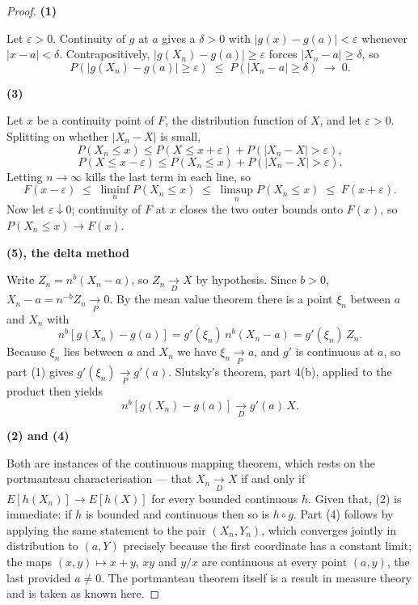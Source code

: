 \documentclass[12pt,a4paper]{report}
\theoremstyle{definition}
\newcommand{\subhead}[1]{%
  \par\medskip\noindent\textbf{#1}\par\nobreak\smallskip}
\begin{document}
\begin{proof}
\subhead{(1)}
Let $\varepsilon>0$. Continuity of $g$ at $a$ gives a $\delta>0$ with
$\left|g(x)-g(a)\right|<\varepsilon$ whenever $\left|x-a\right|<\delta$.
Contrapositively, $\left|g(X_n)-g(a)\right|\geq\varepsilon$ forces
$\left|X_n-a\right|\geq\delta$, so
\[P\left(\left|g(X_n)-g(a)\right|\geq\varepsilon\right)
\;\leq\; P\left(\left|X_n-a\right|\geq\delta\right)\;\longrightarrow\;0 .\]

\subhead{(3)}
Let $x$ be a continuity point of $F$, the distribution function of $X$, and let
$\varepsilon>0$. Splitting on whether $\left|X_n-X\right|$ is small,
\[P(X_n\leq x) \leq P(X\leq x+\varepsilon) + P\left(\left|X_n-X\right|>\varepsilon\right),\]
\[P(X\leq x-\varepsilon) \leq P(X_n\leq x) + P\left(\left|X_n-X\right|>\varepsilon\right).\]
Letting $n\rightarrow\infty$ kills the last term in each line, so
\[F(x-\varepsilon) \;\leq\; \liminf_n P(X_n\leq x) \;\leq\; \limsup_n P(X_n\leq x)
\;\leq\; F(x+\varepsilon).\]
Now let $\varepsilon\downarrow 0$; continuity of $F$ at $x$ closes the two outer
bounds onto $F(x)$, so $P(X_n\leq x)\rightarrow F(x)$.

\subhead{(5), the delta method}
Write $Z_n = n^{b}\left(X_n-a\right)$, so $Z_n \underset{D}{\longrightarrow} X$
by hypothesis. Since $b>0$, $X_n - a = n^{-b}Z_n \underset{P}{\longrightarrow} 0$.
By the mean value theorem there is a point $\xi_n$ between $a$ and $X_n$ with
\[n^{b}\left[g(X_n)-g(a)\right] = g'(\xi_n)\, n^{b}\left(X_n-a\right) = g'(\xi_n)\, Z_n .\]
Because $\xi_n$ lies between $a$ and $X_n$ we have
$\xi_n \underset{P}{\longrightarrow} a$, and $g'$ is continuous at $a$, so part
(1) gives $g'(\xi_n)\underset{P}{\longrightarrow} g'(a)$. Slutsky's theorem,
part 4(b), applied to the product then yields
\[n^{b}\left[g(X_n)-g(a)\right] \underset{D}{\longrightarrow} g'(a)\,X .\]

\subhead{(2) and (4)}
Both are instances of the continuous mapping theorem, which rests on the
portmanteau characterisation --- that $X_n\underset{D}{\longrightarrow}X$ if and
only if $E\left[h(X_n)\right]\rightarrow E\left[h(X)\right]$ for every bounded
continuous $h$. Given that, (2) is immediate: if $h$ is bounded and continuous
then so is $h\circ g$. Part (4) follows by applying the same statement to the
pair $(X_n,Y_n)$, which converges jointly in distribution to $(a,Y)$ precisely
because the first coordinate has a constant limit; the maps
$(x,y)\mapsto x+y$, $xy$ and $y/x$ are continuous at every point $(a,y)$, the
last provided $a\neq 0$. The portmanteau theorem itself is a result in measure
theory and is taken as known here.
\end{proof}
\end{document}
